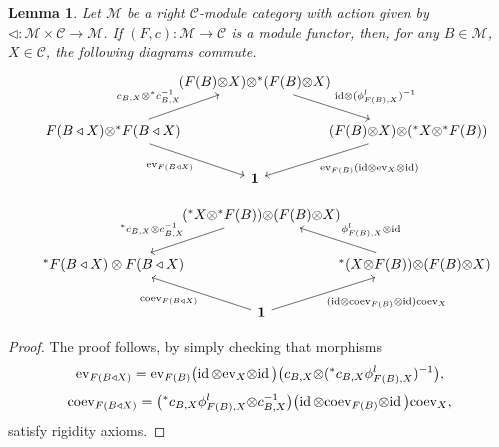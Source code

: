 \documentclass[11pt]{amsart}
\newcommand{\coev}{\mbox{coev}}
\newcommand{\ev}{\mbox{ev}}
\newcommand{\Mo}{{\mathcal M}}
\newcommand{\ca}{{\mathcal C}}
\newcommand{\ot}{{\otimes}}
\newcommand{\uno}{ \mathbf{1}}
\newcommand{\id}{\mbox{\rm id\,}}
\renewcommand{\_}[1]{\mbox{$_{\left( #1 \right)}$}}
\theoremstyle{plain}
\numberwithin{equation}{section}
\newtheorem{lema}[teo]{Lemma}
\theoremstyle{definition}
\theoremstyle{remark}
\def\pf{\begin{proof}}
\def\epf{\end{proof}}
\theoremstyle{introTheorems}
\begin{document}
\begin{lema} Let $\Mo$ be a  right $\ca$-module category with action given by $\triangleleft: \Mo\times \ca\to \Mo$. If $(F,c):\Mo\to \ca$ is a module functor, then, for any $B\in \Mo$, $X\in \ca$, the following diagrams commute. 
\begin{equation}\label{evaluation-mod}
\begin{tikzcd}[column sep=-1em]%
%
&
(F(B)\ot X)\ot {^*}(F(B) \ot X) 
\ar{dr}{\mathrm{id}\otimes (\phi^l_{F(B),X})^{-1}}
&
%
\\
F(B\triangleleft X)\ot {^*}F(B \triangleleft X) 
\ar{ru}{c_{B,X}\ot {^*}c_{B,X}^{-1}}
\arrow[swap]{dr}{\mathrm{ev}_{F(B\triangleleft X )}}
&
%
&
(F(B)\ot X)\ot ({^*}X\ot {^*}F(B)) 
\ar{dl}{\mathrm{ev}_{F(B)}(\mathrm{id}\ot \mathrm{ev}_X\ot \mathrm{id})}
&
\\
%
&
\uno
&
%
\end{tikzcd}
\end{equation}

\begin{equation}\label{coevaluation-mod}
\begin{tikzcd}[column sep=-1em]
%
&
({^*}X\ot {^*}F(B)) \ot (F(B)\ot X)
\arrow[swap]{dl}{{^*}c_{B,X} \ot c^{-1}_{B,X}}
&
%
\\
{^*}F(B \triangleleft X)\otimes F(B\triangleleft X) 
&
%
&
{^*}(X\ot F(B)) \ot (F(B)\ot X)
\arrow[swap]{ul}{\phi^l_{F(B),X}\otimes \mathrm{id}}
&
\\
%
&
\uno
\arrow{ul}{\mathrm{coev}_{F(B\triangleleft X )}}
\arrow[swap]{ur}{(\mathrm{id}\ot \mathrm{coev}_{F(B)}\ot\mathrm{id}) \mathrm{coev}_X }
&
%
\end{tikzcd}
\end{equation}
\end{lema} 
\pf The proof follows, by simply checking that morphisms
$$\ev_{F(B\triangleleft X )} = \ev_{F(B)}\big(\id\ot \ev_X\ot \id \big)\big(c_{B,X}\ot ( {}^*c_{B,X}\phi^l_{F(B),X})^{-1}\big), $$
$$\coev_{F(B\triangleleft X )}= \big( {}^*c_{B,X}\phi^l_{F(B),X} \ot c^{-1}_{B,X}\big)\big(\id\ot \coev_{F(B)}\ot\id\big) \coev_X,$$
satisfy rigidity axioms.
\epf 
\end{document}
